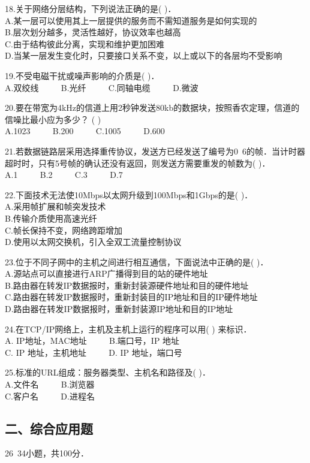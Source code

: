18.关于网络分层结构，下列说法正确的是(    )． \\
A.某一层可以使用其上一层提供的服务而不需知道服务是如何实现的 \\
B.层次划分越多，灵活性越好，协议效率也越高 \\
C.由于结构彼此分离，实现和维护更加困难 \\
D.当某一层发生变化时，只要接口关系不变，以上或以下的各层均不受影响

19.不受电磁干扰或噪声影响的介质是(    )． \\
A.双绞线 $\qquad$ B.光纤 $\qquad$ C.同轴电缆 $\qquad$ D.微波

20.要在带宽为4kHz的信道上用2秒钟发送80kb的数据块，按照香农定理，信道的信噪比最小应为多少？ (    ) \\
A.1023 $\qquad$ B.200 $\qquad$ C.1005 $\qquad$ D.600

21.若数据链路层采用选择重传协议，发送方已经发送了编号为0~6的帧．当计时器超时时，只有5号帧的确认还没有返回，则发送方需要重发的帧数为(    )． \\
A.1 $\qquad$ B.2 $\qquad$ C.3 $\qquad$ D.7

22.下面技术无法使10Mbps以太网升级到100Mbps和1Gbps的是( )． \\
A.采用帧扩展和帧突发技术 \\
B.传输介质使用高速光纤 \\
C.帧长保持不变，网络跨距增加 \\
D.使用以太网交换机，引入全双工流量控制协议

23.位于不同子网中的主机之间进行相互通信，下面说法中正确的是( )． \\
A.源站点可以直接进行ARP广播得到目的站的硬件地址 \\
B.路由器在转发IP数据报时，重新封装源硬件地址和目的硬件地址 \\
C.路由器在转发IP数据报时，重新封装目的IP地址和目的IP硬件地址 \\
D.路由器在转发IP数据报时，重新封装源IP地址和目的IP地址

24.在TCP/IP网络上，主机及主机上运行的程序可以用( ) 来标识． \\
A. IP地址，MAC地址 $\qquad$ B.端口号，IP 地址 \\
C. IP 地址，主机地址 $\qquad$ D. IP 地址，端口号

25.标准的URL组成：服务器类型、主机名和路径及( )． \\
A.文件名 $\qquad$ B.浏览器 \\
C.客户名 $\qquad$ D.进程名

\subsection{二、综合应用题}
26~34小题，共100分．

